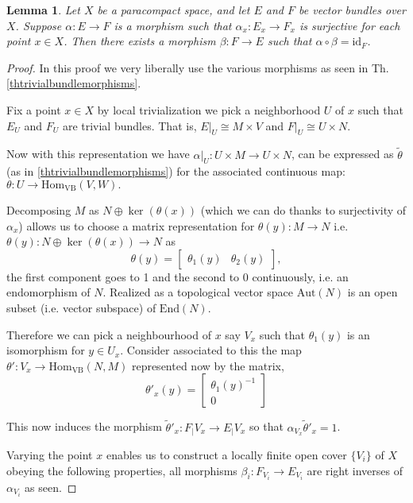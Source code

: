 \documentclass[12pt]{article}
\numberwithin{equation}{section}
\newcommand{\Hom}{{\mathrm{Hom}}}
\newcounter{dummy} \numberwithin{dummy}{section}
\newtheorem{lemma}[dummy]{Lemma}
\begin{document}
	\begin{lemma}
		Let \( X \) be a paracompact space, and let \( E \) and \( F \) be vector bundles over \( X \). Suppose \( \alpha: E \to F \) is a morphism such that \( \alpha_x: E_x \to F_x \) is surjective for each point \( x \in X \). Then there exists a morphism \( \beta: F \to E \) such that \( \alpha \circ \beta = \mathrm{id}_F \).
	\end{lemma}
	\begin{proof}
		In this proof we very liberally use the various morphisms as seen in Th. \ref{thtrivialbundlemorphisms}.
		
		Fix a point $x \in X$ by local trivialization we pick a neighborhood $U$ of $x$ such that $E_U$ and $F_U$ are trivial bundles. That is, $E|_U \cong M \times V$ and $F|_U \cong U \times N$.
		
		Now with this representation we have $\alpha|_U: U \times M \to U \times N$, can be expressed as $\tilde{\theta}$ (as in \ref{thtrivialbundlemorphisms}) for the associated continuous map:
		\(
		\theta: U \to \mathrm{Hom}_{\mathrm{VB}}(V, W).
		\)
		
		Decomposing $M$ as $N\oplus \ker (\theta (x))$ (which we can do thanks to surjectivity of $\alpha_x$) allows us to choose a matrix representation for $\theta(y):M\to N$ i.e. $\theta(y):N \oplus \ker (\theta( x)) \to N$ as
		\[
		\theta(y) = 
		\begin{bmatrix} 
			\theta_1(y) & \theta_2(y) 
		\end{bmatrix},
		\]
		the first component goes to 1 and the second to 0 continuously, i.e. an endomorphism of $N$. Realized as a topological vector space $\mathrm{Aut}(N)$ is an open subset (i.e. vector subspace) of $\mathrm{End}(N)$. 
		
		Therefore we can pick a neighbourhood of $x$ say $V_x$ such that $\theta_1(y)$ is an isomorphism for $y \in U_x$. Consider associated to this the map $\theta': V_x \to \Hom_{\mathrm{VB}}(N,M)$ represented now by the matrix,
		\[ \theta'_x(y)=\begin{bmatrix}
			\theta_1(y)^{-1}\\0
		\end{bmatrix} \]
			
		This now induces the morphism $\tilde{\theta}'_x: F_|{V_x} \to E_|{V_x}$ so that $\alpha_{V_x} \tilde{\theta}'_x = 1$. 
		
		Varying the point $x$ enables us to construct a locally finite open cover $\{V_i\}$ of $X$ obeying the following properties, all morphisms $\beta_i: F_{V_i} \to E_{V_i}$ are right inverses of $\alpha_{V_i}$ as seen.
		

\end{proof}
\end{document}
